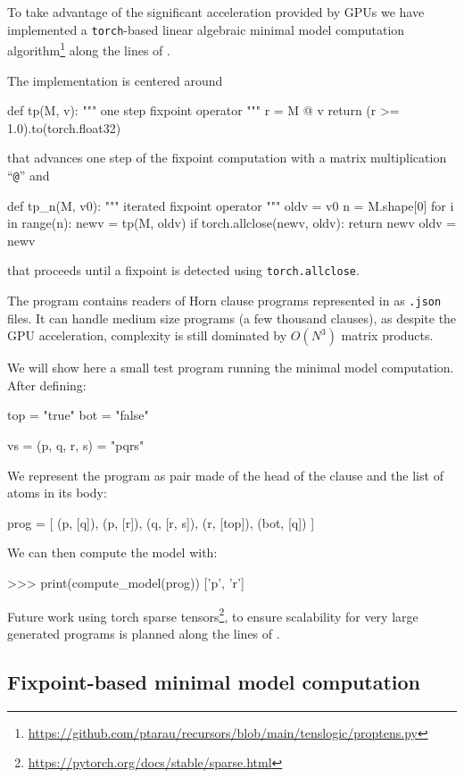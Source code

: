 \documentclass[submission,copyright,creativecommons]{eptcs}
\begin{document}
To take advantage of the significant acceleration provided by GPUs we have implemented
a {\tt torch}-based linear algebraic minimal model computation 
algorithm\footnote{\url{https://github.com/ptarau/recursors/blob/main/tenslogic/proptens.py}} along the lines of \cite{linalg_lp}.

The implementation is centered around
\begin{code}
def tp(M, v):
    """
    one step fixpoint operator
    """
    r = M @ v
    return (r >= 1.0).to(torch.float32)
\end{code}
that advances one step of the fixpoint computation with a matrix multiplication ``\verb~@~'' and
\begin{code}
def tp_n(M, v0):
    """
    iterated fixpoint operator
    """
    oldv = v0
    n = M.shape[0]
    for i in range(n):
        newv = tp(M, oldv)
        if torch.allclose(newv, oldv):
            return newv
        oldv = newv
\end{code}
that proceeds until a fixpoint is detected using {\tt torch.allclose}.

The program contains readers of Horn clause programs represented in as {\tt .json} files. It can handle medium size programs (a few thousand clauses), as despite the GPU acceleration, complexity is still dominated by $O(N^3)$ matrix products.

We will show here a small test program running the minimal model computation. After defining:
\begin{code}
top = "true"
bot = "false"

vs = (p, q, r, s) = "pqrs"
\end{code}
We represent the program as pair made of the head of the clause and the list of atoms in its body:
\begin{code}
prog = [
        (p, [q]),
        (p, [r]),
        (q, [r, s]),
        (r, [top]),
        (bot, [q])
]
\end{code}
We can then compute the model with:
\begin{codex}
>>> print(compute_model(prog))
['p', 'r']
\end{codex}

Future work using torch sparse 
tensors\footnote{\url{https://pytorch.org/docs/stable/sparse.html}}, to ensure scalability for very large generated programs is planned along the lines of \cite{sparse2022}.

\subsection{Fixpoint-based minimal model computation}
\end{document}
